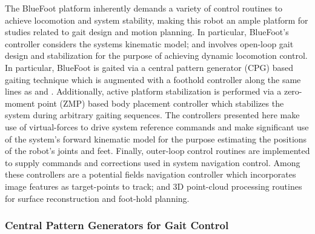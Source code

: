 		The BlueFoot platform inherently demands a variety of control routines to achieve locomotion and system stability, making this robot an ample platform for studies related to gait design and motion planning. In particular, BlueFoot's controller considers the systems kinematic model; and involves open-loop gait design and stabilization for the purpose of achieving dynamic locomotion control. In particular, BlueFoot is gaited via a central pattern generator (CPG) based gaiting technique which is augmented with a foothold controller along the same lines as \cite{Ajallooeian2013} and \cite{Rutishauser2008}. Additionally, active platform stabilization is performed via a zero-moment point (ZMP) based body placement controller which stabilizes the system during arbitrary gaiting sequences. The controllers presented here make use of virtual-forces to drive system reference commands and make significant use of the system's forward kinematic model for the purpose estimating the positions of the robot's joints and feet. Finally, outer-loop control routines are implemented to supply commands and corrections used in system navigation control. Among these controllers are a potential fields navigation controller which incorporates image features as target-points to track; and 3D point-cloud processing routines for surface reconstruction and foot-hold planning.

		\subsubsection{Central Pattern Generators for Gait Control}

